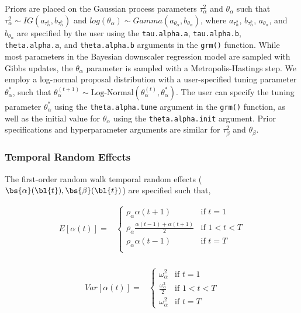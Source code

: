 Priors are placed on the Gaussian process parameters $\tau_{\alpha}^2$ and $\theta_{\alpha}$ such that $\tau_{\alpha}^2 \sim IG(a_{\tau_{\alpha}^2}, b_{\tau_{\alpha}^2})$ and $log(\theta_{\alpha}) \sim Gamma(a_{\theta_{\alpha}}, b_{\theta_{\alpha}})$, where $a_{\tau_{\alpha}^2}$, $b_{\tau_{\alpha}^2}$, $a_{\theta_{\alpha}}$, and $b_{\theta_{\alpha}}$ are specified by the user using the \texttt{tau.alpha.a}, \texttt{tau.alpha.b}, \texttt{theta.alpha.a}, and \texttt{theta.alpha.b} arguments in the \texttt{grm()} function. 
While most parameters in the Bayesian downscaler regression model are sampled with Gibbs updates, the $\theta_{\alpha}$ parameter is sampled with a Metropolis-Hastings step. 
We employ a log-normal proposal distribution with a user-specified tuning parameter $\theta_{\alpha}^*$, such that $\theta_{\alpha}^{(t+1)} \sim \text{Log-Normal}(\theta_{\alpha}^{(t)}, \theta_{\alpha}^*)$.
The user can specify the tuning parameter $\theta_{\alpha}^*$ using the \texttt{theta.alpha.tune} argument in the \texttt{grm()} function, as well as the initial value for $\theta_{\alpha}$ using the \texttt{theta.alpha.init} argument.
Prior specifications and hyperparameter arguments are similar for $\tau_{\beta}^2$ and $\theta_{\beta}$.



\subsubsection*{Temporal Random Effects}

The first-order random walk temporal random effects ($\bs{\alpha}(\bl{t}), \bs{\beta}(\bl{t})$) are specified such that,

\begin{align*}
    E[\alpha(t)] =& 
    \begin{cases} 
        \rho_{\alpha} \alpha(t+1) & \text{if } t = 1 \\ 
        \rho_{\alpha} \frac{\alpha(t-1) + \alpha(t+1)}{2} & \text{if } 1 < t < T \\
        \rho_{\alpha} \alpha(t-1) & \text{if } t = T \\
    \end{cases} \\
\end{align*}

\begin{align*}
    Var[\alpha(t)] =& 
    \begin{cases} 
        \omega^2_{\alpha} & \text{if } t = 1 \\
        \frac{\omega^2_{\alpha}}{2} & \text{if } 1 < t < T \\
        \omega^2_{\alpha} & \text{if } t = T
    \end{cases} \\
\end{align*}

